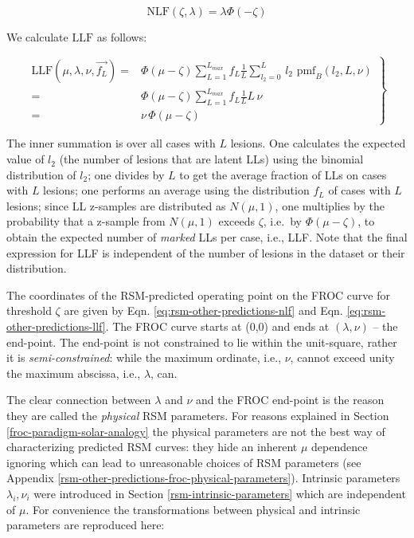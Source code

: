 \documentclass[
]{book}
\begin{document}
\begin{equation}
\text{NLF} \left ( \zeta, \lambda \right ) = \lambda \Phi \left (-\zeta \right )
\label{eq:rsm-other-predictions-nlf}
\end{equation}

We calculate \(\text{LLF}\) as follows:

\begin{equation} 
\left. 
\begin{aligned}
\text{LLF} \left ( \mu, \lambda, \nu, \overrightarrow{f_L} \right ) 
=& \Phi\left ( \mu - \zeta \right )\sum_{L=1}^{L_{max}} f_L \frac{1}{L} \sum_{l_2=0}^{L}  \, l_2 \,\,  \text{pmf}_{B}\left ( l_2, L, \nu \right )\\
=&\Phi\left ( \mu - \zeta \right )\sum_{L=1}^{L_{max}} f_L \frac{1}{L} L \,\nu\\
=&\nu \,\Phi\left ( \mu - \zeta \right )
\end{aligned}
\right \}
\label{eq:rsm-other-predictions-llf}
\end{equation}

The inner summation is over all cases with \(L\) lesions. One calculates the expected value of \(l_2\) (the number of lesions that are latent LLs) using the binomial distribution of \(l_2\); one divides by \(L\) to get the average fraction of LLs on cases with \(L\) lesions; one performs an average using the distribution \(f_L\) of cases with \(L\) lesions; since LL z-samples are distributed as \(N(\mu,1)\), one multiplies by the probability that a z-sample from \(N(\mu,1)\) exceeds \(\zeta\), i.e.~by \(\Phi(\mu-\zeta)\), to obtain the expected number of \emph{marked} LLs per case, i.e., LLF. Note that the final expression for LLF is independent of the number of lesions in the dataset or their distribution.

The coordinates of the RSM-predicted operating point on the FROC curve for threshold \(\zeta\) are given by Eqn. \eqref{eq:rsm-other-predictions-nlf} and Eqn. \eqref{eq:rsm-other-predictions-llf}. The FROC curve starts at (0,0) and ends at \(\left ( \lambda, \nu \right )\) -- the end-point. The end-point is not constrained to lie within the unit-square, rather it is \emph{semi-constrained}: while the maximum ordinate, i.e., \(\nu\), cannot exceed unity the maximum abscissa, i.e., \(\lambda\), can.

The clear connection between \(\lambda\) and \(\nu\) and the FROC end-point is the reason they are called the \emph{physical} RSM parameters. For reasons explained in Section \ref{froc-paradigm-solar-analogy} the physical parameters are not the best way of characterizing predicted RSM curves: they hide an inherent \(\mu\) dependence ignoring which can lead to unreasonable choices of RSM parameters (see Appendix \ref{rsm-other-predictions-froc-physical-parameters}). Intrinsic parameters \(\lambda_i, \nu_i\) were introduced in Section \ref{rsm-intrinsic-parameters} which are independent of \(\mu\). For convenience the transformations between physical and intrinsic parameters are reproduced here:
\end{document}
